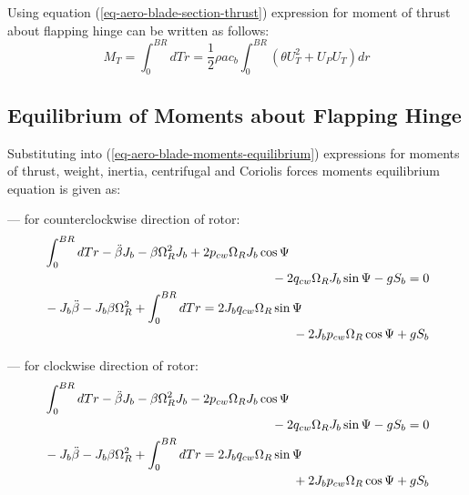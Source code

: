 Using equation (\ref{eq-aero-blade-section-thrust}) expression for moment of thrust about flapping hinge can be written as follows:
\begin{equation}
  M_T =
  \int_{0}^{BR} dT r = 
  \frac{1}{2} \rho a c_b
  \int_{0}^{BR} \left( \theta U_T^2 + U_P U_T \right) dr
\end{equation}

\subsection{Equilibrium of Moments about Flapping Hinge}

Substituting into (\ref{eq-aero-blade-moments-equilibrium}) expressions for moments of thrust, weight, inertia, centrifugal and Coriolis forces moments equilibrium equation is given as:

--- for counterclockwise direction of rotor:
\begin{gather}
  \begin{multlined}[0.88\textwidth]
    \int_{0}^{BR} dT r
    - \ddot \beta J_b
    - \beta \Omega_R^2 J_b
    + 2 p_{cw} \Omega_R J_b \cos \Psi \\
    - 2 q_{cw} \Omega_R J_b \sin \Psi
    - g S_b
    = 0
  \end{multlined}
  \\
  \begin{multlined}[0.88\textwidth]
    \label{eq-aero-equilibrium-blade-moments-ccw-1}
    - J_b \ddot \beta
    - J_b \beta \Omega_R^2
    + \int_{0}^{BR} dT r
    = 2 J_b q_{cw} \Omega_R \sin \Psi \\
    - 2 J_b p_{cw} \Omega_R \cos \Psi
    + g S_b
  \end{multlined}
\end{gather}
  
--- for clockwise direction of rotor:
\begin{gather}
  \begin{multlined}[0.88\textwidth]
    \int_{0}^{BR} dT r
    - \ddot \beta J_b
    - \beta \Omega_R^2 J_b
    - 2 p_{cw} \Omega_R J_b \cos \Psi \\
    - 2 q_{cw} \Omega_R J_b \sin \Psi
    - g S_b
    = 0
  \end{multlined}
  \\
  \begin{multlined}[0.88\textwidth]
    \label{eq-aero-equilibrium-blade-moments-cw-1}
    - J_b \ddot \beta
    - J_b \beta \Omega_R^2
    + \int_{0}^{BR} dT r
    = 2 J_b q_{cw} \Omega_R \sin \Psi \\
    + 2 J_b p_{cw} \Omega_R \cos \Psi
    + g S_b
  \end{multlined}
\end{gather}

